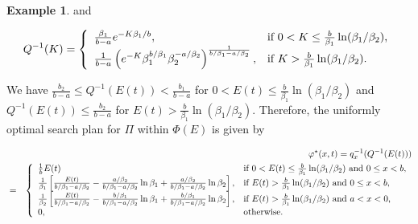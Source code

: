\documentclass[12pt]{article}
\theoremstyle{plain}
\theoremstyle{definition}
\newtheorem{example}{Example}%
\theoremstyle{remark}
\begin{document}
\begin{example}
and 



\begin{eqnarray*}
Q^{-1}(K) =\left\{
		                           \begin{array}{ll}
		                          \frac{\beta_1}{b-a}e^{-K\beta_1/b},& \hbox{if $0<K\leq \frac{b}{\beta_1}\ln (\beta_1/\beta_2)$,} \\
		                        \frac{1}{b-a}\left(e^{-K} \beta_1^{b/\beta_1}\beta_2^{-a/\beta_2}\right)^{\frac{1}{b/\beta_1-a/\beta_2}},& \hbox{if $K> \frac{b}{\beta_1}\ln (\beta_1/\beta_2)$.} \\
		                          \end{array}
		                         \right.
\end{eqnarray*}


We have $\frac{b_2}{b-a}\leq Q^{-1}(E(t))<\frac{b_1}{b-a}$ for $0<E(t)\leq \frac{b}{\beta_1}\ln(\beta_1/\beta_2)$ and $Q^{-1}(E(t))\leq \frac{b_2}{b-a}$ for $E(t)> \frac{b}{\beta_1}\ln(\beta_1/\beta_2)$.
Therefore,  the uniformly optimal search plan for $\Pi$ within $\Phi(E)$ is given by 

\begin{eqnarray*}
 & & \varphi^\star (x, t) = q_x^{-1}(Q^{-1}(E(t))) \\
				&=& \left\{
		                           \begin{array}{ll}
		                           \frac{1}{b}E(t) &  \hbox{if  $0<E(t)\leq \frac{b}{\beta_1}\ln(\beta_1/\beta_2)$ and $0\leq x<b$,} \\
		                          \frac{1}{\beta_1} \left[\frac{E(t)}{b/\beta_1-a/\beta_2}-\frac{a/\beta_2}{b/\beta_1-a/\beta_2}\ln \beta_1+
		                          \frac{a/\beta_2}{b/\beta_1-a/\beta_2}\ln \beta_2
		                          \right],& \hbox{if  $E(t)>\frac{b}{\beta_1}\ln(\beta_1/\beta_2)$ and $0\leq x<b$,} \\		                        
		                           \frac{1}{\beta_2} \left[\frac{E(t)}{b/\beta_1-a/\beta_2}-\frac{b/\beta_1}{b/\beta_1-a/\beta_2}\ln \beta_1+
		                          \frac{b/\beta_1}{b/\beta_1-a/\beta_2}\ln \beta_2
		                          \right],& \hbox{if  $E(t)>\frac{b}{\beta_1}\ln(\beta_1/\beta_2)$ and $a<x<0$,} \\
		                          0,& \hbox{otherwise.} \\
		                          \end{array}
		                         \right.
\end{eqnarray*}




\end{example}
\end{document}
